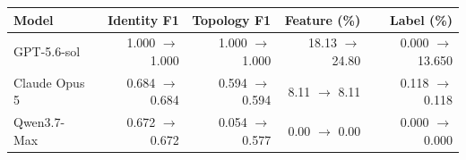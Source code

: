 \begin{tabular}{lrrrr}\toprule
Model & Identity F1 & Topology F1 & Feature (\%) & Label (\%)\\\midrule
GPT-5.6-sol & 1.000 $\to$ 1.000 & 1.000 $\to$ 1.000 & 18.13 $\to$ 24.80 & 0.000 $\to$ 13.650\\
Claude Opus 5 & 0.684 $\to$ 0.684 & 0.594 $\to$ 0.594 & 8.11 $\to$ 8.11 & 0.118 $\to$ 0.118\\
Qwen3.7-Max & 0.672 $\to$ 0.672 & 0.054 $\to$ 0.577 & 0.00 $\to$ 0.00 & 0.000 $\to$ 0.000\\
\bottomrule\end{tabular}
